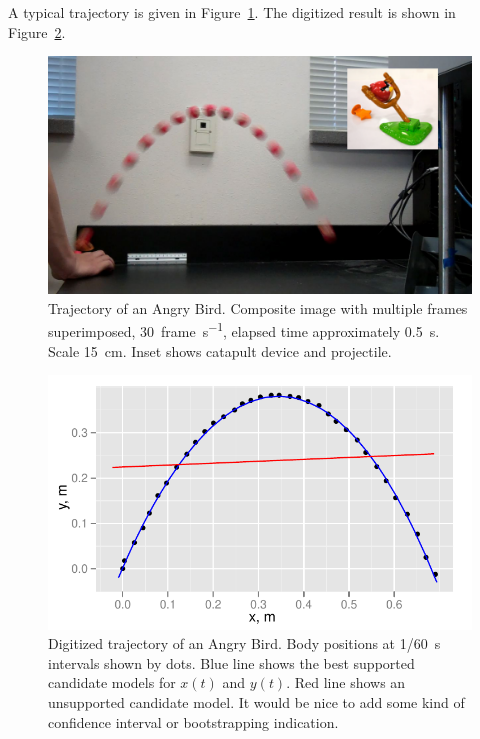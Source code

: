 A typical trajectory is given in Figure~\ref{fig:redbird1}. The digitized result is shown in Figure~\ref{fig:redbird2}. 

\begin{figure}
\includegraphics[width=\textwidth]{figures/tdd-AngryBirdComposite.pdf}
\caption{Trajectory of an Angry Bird.  Composite image with multiple frames superimposed, \SI{30}{frame\per\second}, elapsed time approximately \SI{0.5}{\second}. Scale \SI{15}{\centi\meter}.  Inset shows catapult device and projectile.}
\label{fig:redbird1}
\end{figure}

\begin{figure}
\includegraphics[width=\textwidth]{figures/tdd-angrybird2.pdf}
\caption{Digitized trajectory of an Angry Bird.  Body positions at \SI{1/60}{\second} intervals shown by dots. Blue line shows the best supported candidate models for $x(t)$ and $y(t)$.  Red line shows an unsupported candidate model.  It would be nice to add some kind of confidence interval or bootstrapping indication.}
\label{fig:redbird2}
\end{figure}

